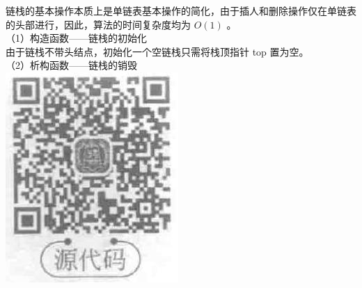 \documentclass[10pt]{article}
\begin{document}
链栈的基本操作本质上是单链表基本操作的简化，由于插人和删除操作仅在单链表的头部进行，因此，算法的时间复杂度均为 $O(1)$ 。\\
（1）构造函数——链栈的初始化\\
由于链栈不带头结点，初始化一个空链栈只需将栈顶指针 top 置为空。\\
（2）析构函数——链栈的销毁\\
\includegraphics[max width=\textwidth, center]{2025_06_06_704745ea57b15b2333e5g-089}
\end{document}
